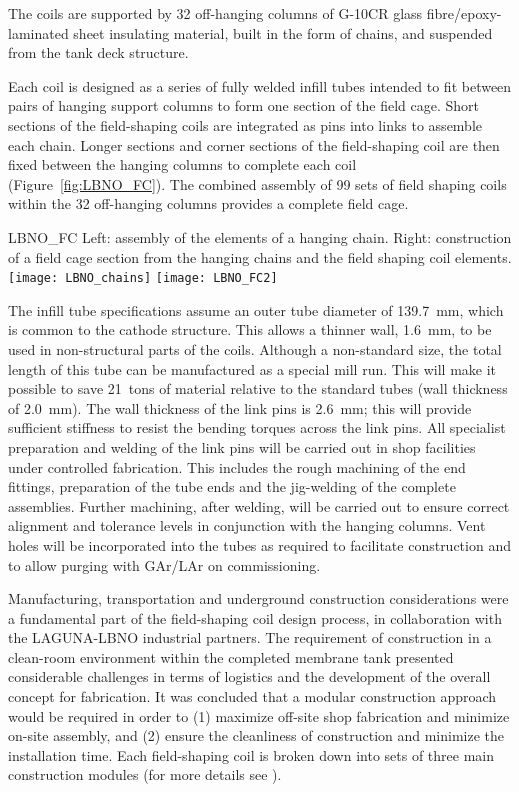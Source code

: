 The coils are supported by 32 off-hanging columns of G-10CR glass
fibre/epoxy-laminated sheet insulating material, built in the form of
chains, and suspended from the tank deck structure.

Each coil is designed as a series of fully welded infill tubes
intended to fit between pairs of hanging support columns to form one
section of the field cage.  Short sections of the field-shaping coils
are integrated as pins into links to assemble each chain.  Longer
sections and corner sections of the field-shaping coil are then fixed
between the hanging columns to complete each coil
(Figure~\ref{fig:LBNO_FC}). The combined assembly of 99 sets of field
shaping coils within the 32 off-hanging columns provides a complete
field cage.
\begin{cdrfigure}{LBNO_FC}
{\small Left: assembly of the elements of a hanging chain. Right: 
construction of a field cage section from the hanging chains and the field shaping coil elements.}
\texttt{[image: LBNO\_chains]} \hfill
\texttt{[image: LBNO\_FC2]}
\end{cdrfigure}

The infill tube specifications assume an outer tube diameter of 139.7~mm,
which is common to the cathode structure.  This allows a thinner wall,
1.6~mm, to be used in non-structural parts of the coils.  Although a
non-standard size, the total length of this tube can be manufactured
as a special mill run.  This will make it possible to save 21~tons of
material relative to the standard tubes (wall thickness of
2.0~mm). The wall thickness of the link pins is 2.6~mm; this will
provide sufficient stiffness to resist the bending torques across
the link pins.  All specialist preparation and welding of the link
pins will be carried out in shop facilities under controlled
fabrication.  This includes the rough machining of the end fittings,
preparation of the tube ends and the jig-welding of the complete
assemblies. Further machining, after welding, will be carried out to
ensure correct alignment and tolerance levels in conjunction with the
hanging columns.  Vent holes will be incorporated into the tubes as
required to facilitate construction and to allow purging with GAr/LAr
on commissioning.

Manufacturing, transportation and underground construction
considerations were a fundamental part of the field-shaping coil
design process, in collaboration with the LAGUNA-LBNO industrial
partners. The requirement of construction in a clean-room environment
within the completed membrane tank presented considerable challenges
in terms of logistics and the development of the overall concept for
fabrication.  It was concluded that a modular construction approach
would be required in order to (1) maximize off-site shop fabrication
and minimize on-site assembly, and (2) ensure the cleanliness of
construction and minimize the installation time.
Each field-shaping coil is broken down into sets of three main construction modules
(for more details see  \anxlbnob). 

